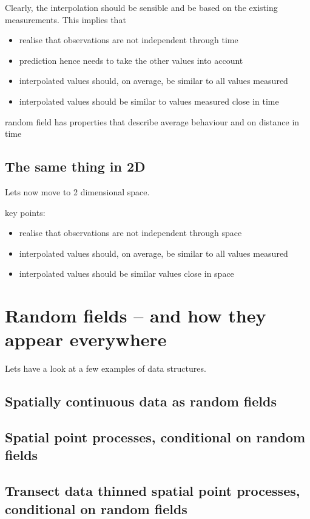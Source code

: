 Clearly, the interpolation should be sensible and be based on the existing measurements. This implies that 
\begin{itemize}
\item realise that observations are not independent through time
\item prediction hence needs to take the other values into account 
\item interpolated values should, on average, be similar to all values measured
\item interpolated values should be similar to values measured close in time
\end{itemize}



random field has properties that describe average behaviour and on distance in time


\subsection{The same thing in 2D}
Lets now move to 2 dimensional space. 

key points:
\begin{itemize}
\item realise that observations are not independent through space
\item interpolated values should, on average, be similar to all values measured
\item interpolated values should be similar values close in space
\end{itemize}

\section{Random fields -- and how they appear everywhere}

Lets have a look at a few examples of data structures.

\subsection{Spatially continuous data as random fields}

\subsection{Spatial point processes, conditional on random fields}

\subsection{Transect data thinned spatial point processes, conditional on random fields}


